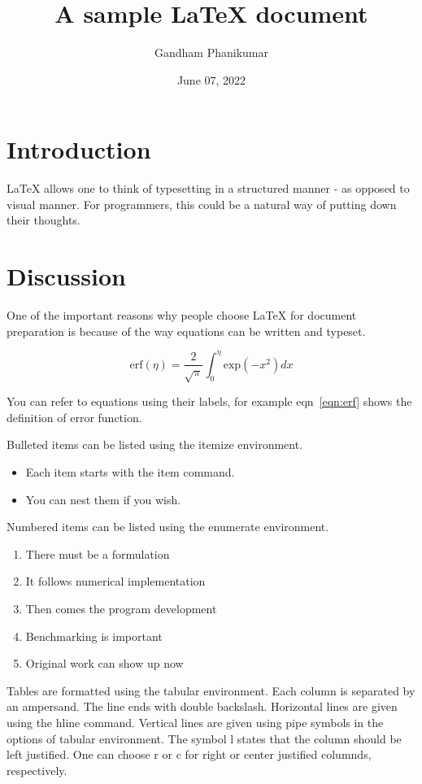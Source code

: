 \documentclass[12pt,a4paper]{article}
\author{Gandham Phanikumar}
\title{A sample LaTeX document}
\date{June 07, 2022}
\begin{document}
\maketitle

\section{Introduction}

LaTeX allows one to think of typesetting in a structured manner - as opposed to visual manner. For programmers, this could be a natural way of putting down their thoughts.

\section{Discussion}

One of the important reasons why people choose LaTeX for document preparation is because of the way equations can be written and typeset.

\begin{equation}
	\text{erf}(\eta) = \frac{2}{\sqrt{\pi}} \int_{0}^{\eta}{ \text{exp}(-x^2) dx}
	\label{eqn:erf}
\end{equation}

You can refer to equations using their labels, for example eqn~\ref{eqn:erf} shows the definition of error function.

Bulleted items can be listed using the itemize environment.

\begin{itemize}
\item Each item starts with the item command.
\item You can nest them if you wish.
\end{itemize}

Numbered items can be listed using the enumerate environment.

\begin{enumerate}
\item There must be a formulation
\item It follows numerical implementation
\item Then comes the program development
\item Benchmarking is important
\item Original work can show up now
\end{enumerate}

Tables are formatted using the tabular environment. Each column is separated by an ampersand. The line ends with double backslash. Horizontal lines are given using the hline command. Vertical lines are given using pipe symbols in the options of tabular environment. The symbol l states that the column should be left justified. One can choose r or c for right or center justified columnds, respectively.
\end{document}
